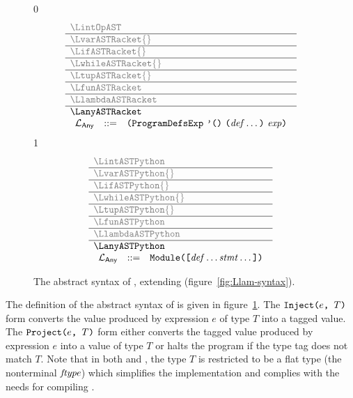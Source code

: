 \documentclass[7x10]{TimesAPriori_MIT}%
\newcommand{\gray}[1]{{\color{gray} #1}}
\def\racketEd{0}
\def\pythonEd{1}
\def\edition{1}
\newcommand{\racket}[1]{{\if\edition\racketEd{#1}\fi}}
\newcommand{\pythonColor}[0]{}
\numberwithin{theorem}{chapter}
\numberwithin{definition}{chapter}
\numberwithin{equation}{chapter}
\begin{document}
\begin{figure}[tp]
\centering
\begin{tcolorbox}[colback=white]
    \small
{\if\edition\racketEd
\[
\begin{array}{l}
  \gray{\LintOpAST} \\ \hline
  \gray{\LvarASTRacket{}} \\ \hline
  \gray{\LifASTRacket{}} \\ \hline
  \gray{\LwhileASTRacket{}} \\ \hline
  \gray{\LtupASTRacket{}} \\ \hline
  \gray{\LfunASTRacket} \\ \hline
  \gray{\LlambdaASTRacket} \\ \hline
  \LanyASTRacket \\
\begin{array}{lcl}
  \LangAnyM{} &::=& \PROGRAMDEFSEXP{\code{'()}}{\LP\Def\ldots\RP}{\Exp}
\end{array}
\end{array}
\]
\fi}
{\if\edition\pythonEd\pythonColor
\[
\begin{array}{l}
  \gray{\LintASTPython} \\ \hline
  \gray{\LvarASTPython{}} \\ \hline
  \gray{\LifASTPython{}} \\ \hline
  \gray{\LwhileASTPython{}} \\ \hline
  \gray{\LtupASTPython{}} \\ \hline
  \gray{\LfunASTPython} \\ \hline
  \gray{\LlambdaASTPython} \\ \hline
  \LanyASTPython \\
  \begin{array}{lcl}
  \LangAnyM{} &::=& \PROGRAM{}{\LS \Def \ldots \Stmt \ldots \RS}
  \end{array}
\end{array}
\]
\fi}
\end{tcolorbox}

\caption{The abstract syntax of \LangAny{}, extending \LangLam{} (figure~\ref{fig:Llam-syntax}).}
\label{fig:Lany-syntax}
\end{figure}

The definition of the abstract syntax of \LangAny{} is given in
figure~\ref{fig:Lany-syntax}.
The $\texttt{Inject}\texttt{(} e\texttt{, }T\texttt{)}$ form converts the value produced by expression $e$
of type $T$ into a tagged value.  The $\texttt{Project}\texttt{(} e\texttt{, }T\texttt{)}$ form either
converts the tagged value produced by expression $e$ into a value of
type $T$ or halts the program if the type tag does not match $T$.
%
Note that in both  and , the type $T$ is
restricted to be a flat type (the nonterminal $\mathit{ftype}$) which
simplifies the implementation and complies with the needs for
compiling \LangDyn{}.
\end{document}
